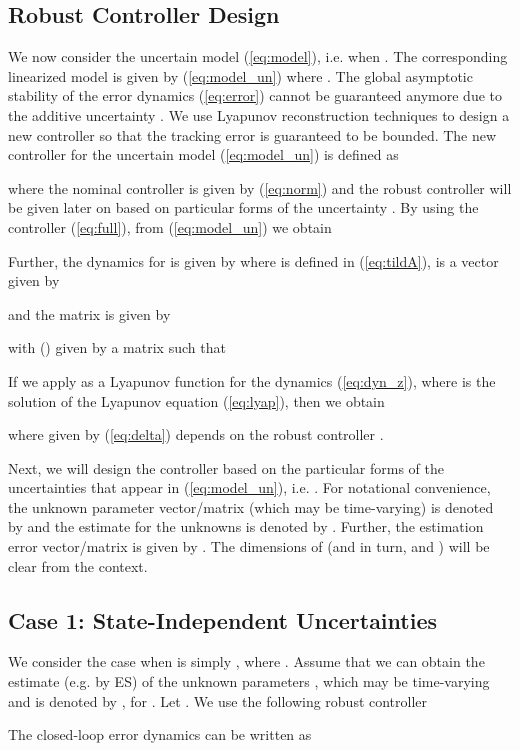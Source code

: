 \documentclass[twoside,leqno,onecolumn]{article}
\begin{document}
\subsection{Robust Controller Design} \label{sec:robust}
We now consider the uncertain model (\ref{eq:model}), i.e. when
. The corresponding linearized model is given
by (\ref{eq:model_un}) where . The
global asymptotic stability of the error dynamics (\ref{eq:error})
cannot be guaranteed anymore due to the additive uncertainty
. We use  Lyapunov reconstruction techniques
to design a new controller so that the tracking error is
guaranteed to be bounded. The new controller for the uncertain
model (\ref{eq:model_un}) is defined as

where the nominal controller  is given by (\ref{eq:norm})
and the robust controller  will be given later on based on
particular forms of the uncertainty . By using
the controller (\ref{eq:full}), from (\ref{eq:model_un}) we obtain

Further, the dynamics for  is given by
where  is defined in (\ref{eq:tildA}),  is a
 vector given by

and the matrix  is given by

with  () given by a 
matrix such that

If we apply  as a Lyapunov function for the dynamics
(\ref{eq:dyn_z}), where  is the solution of the Lyapunov
equation (\ref{eq:lyap}), then we obtain

where  given by (\ref{eq:delta}) depends on the robust
controller .

Next, we will design the controller  based on the
particular forms of the uncertainties that appear in
(\ref{eq:model_un}), i.e. . For notational
convenience, the unknown parameter vector/matrix (which may be
time-varying) is denoted by  and the estimate for the
unknowns is denoted by . Further, the
estimation error vector/matrix is given by . The dimensions of  (and in
turn,  and ) will be clear from the
context.



\subsection{Case 1: State-Independent Uncertainties}
\label{sec:case1} We consider the case when 
is simply , where . Assume that we can obtain the
estimate (e.g. by ES) of the unknown parameters ,
which may be time-varying and is denoted by , for .  Let .
We use the following robust controller

The closed-loop error dynamics can be written as
\end{document}

